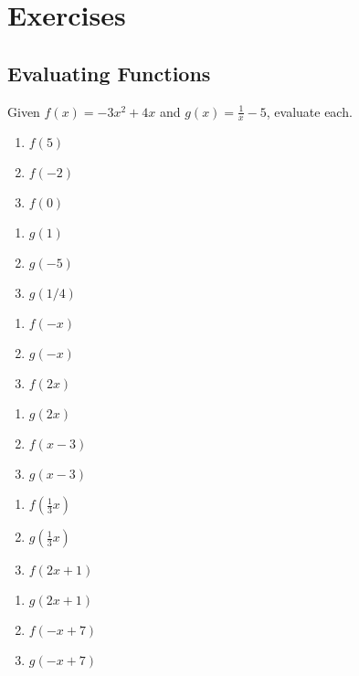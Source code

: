 \section{Exercises}

\subsection*{Evaluating Functions}

Given $f(x) = -3x^2 + 4x$ and $g(x) = \frac{1}{x}-5$, evaluate each.
\begin{multicols}{3}
\begin{enumerate}
	\item $f(5)$
	\item $f(-2)$
	\item $f(0)$
\end{enumerate}	\setcounter{Review}{\value{enumi}}
\end{multicols}
\begin{multicols}{3}
\begin{enumerate}	\setcounter{enumi}{\value{Review}}
	\item $g(1)$
	\item $g(-5)$
	\item $g(1/4)$
\end{enumerate}	\setcounter{Review}{\value{enumi}}
\end{multicols}
\begin{multicols}{3}
\begin{enumerate}	\setcounter{enumi}{\value{Review}}
	\item $f(-x)$
	\item $g(-x)$
	\item $f(2x)$
\end{enumerate}	\setcounter{Review}{\value{enumi}}
\end{multicols}
\begin{multicols}{3}
\begin{enumerate}	\setcounter{enumi}{\value{Review}}
	\item $g(2x)$
	\item $f(x-3)$
	\item $g(x-3)$
\end{enumerate}	\setcounter{Review}{\value{enumi}}
\end{multicols}
\begin{multicols}{3}
\begin{enumerate}	\setcounter{enumi}{\value{Review}}
	\item $f\left(\frac{1}{3}x\right)$
	\item $g\left(\frac{1}{3}x\right)$
	\item $f(2x+1)$
\end{enumerate}	\setcounter{Review}{\value{enumi}}
\end{multicols}
\begin{multicols}{3}
\begin{enumerate}	\setcounter{enumi}{\value{Review}}
	\item $g(2x+1)$
	\item $f(-x+7)$
	\item $g(-x+7)$
\end{enumerate}
\end{multicols}

